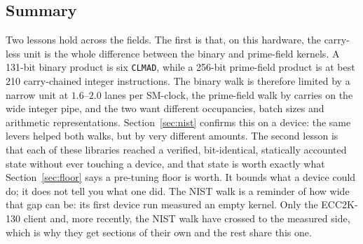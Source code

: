 \subsection{Summary}

Two lessons hold across the fields. The first is that, on this
hardware, the carry-less unit is the whole difference between the
binary and prime-field kernels. A 131-bit binary product is six
\texttt{CLMAD}, while a 256-bit prime-field product is at best 210
carry-chained integer instructions. The binary walk is therefore
limited by a narrow unit at $1.6$--$2.0$ lanes per SM-clock, the
prime-field walk by carries on the wide integer pipe, and the two want
different occupancies, batch sizes and arithmetic representations.
Section~\ref{sec:nist} confirms this on a device: the same levers
helped both walks, but by very different amounts. The second lesson is
that each of these libraries reached a verified, bit-identical,
statically accounted state without ever touching a device, and that
state is worth exactly what Section~\ref{sec:floor} says a pre-tuning
floor is worth. It bounds what a device could do; it does not tell you
what one did. The NIST walk is a reminder of how wide that gap can be:
its first device run measured an empty kernel. Only the ECC2K-130
client and, more recently, the NIST walk have crossed to the measured
side, which is why they get sections of their own and the rest share
this one.

